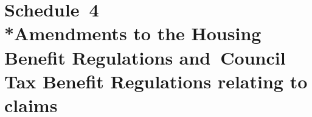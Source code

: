 \documentclass[12pt,a4paper]{article}
\begin{document}
%
%
%
%
%
%
%
%
%

\part[Schedule~4 --- Amendments to the Housing Benefit Regulations and~Council Tax Benefit Regulations relating to claims]{Schedule~4\\*Amendments to the Housing Benefit Regulations and~Council Tax Benefit Regulations relating to claims}
\end{document}

